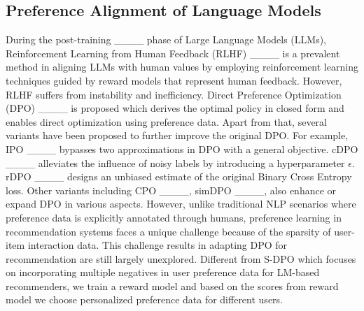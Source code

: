 \subsection{Preference Alignment of Language Models}
During the post-training ____ phase of Large Language Models (LLMs), Reinforcement Learning from Human Feedback (RLHF) ____ is a prevalent method in aligning LLMs with human values by employing reinforcement learning techniques guided by reward models that represent human feedback. However, RLHF suffers from instability and inefficiency. Direct Preference Optimization (DPO) ____ is proposed which derives the optimal policy in closed form and enables direct optimization using preference data. Apart from that, several variants have been proposed to further improve the original DPO. For example, IPO ____ bypasses two approximations in DPO with a general objective. cDPO ____ alleviates the influence of noisy labels by introducing a hyperparameter $\epsilon$. rDPO ____ designs an unbiased estimate of the original Binary Cross Entropy loss. Other variants including CPO ____, simDPO ____, also enhance or expand
DPO in various aspects. However, unlike traditional NLP scenarios where preference data is explicitly annotated through humans, preference learning in recommendation systems faces a unique challenge because of the sparsity of user-item interaction data. This challenge results in adapting DPO for recommendation are still largely unexplored. Different from S-DPO which focuses on incorporating multiple negatives in user preference data for LM-based recommenders, we train a reward model and based on the scores from reward model we choose personalized preference data for different users.

\vspace{-0.4cm}